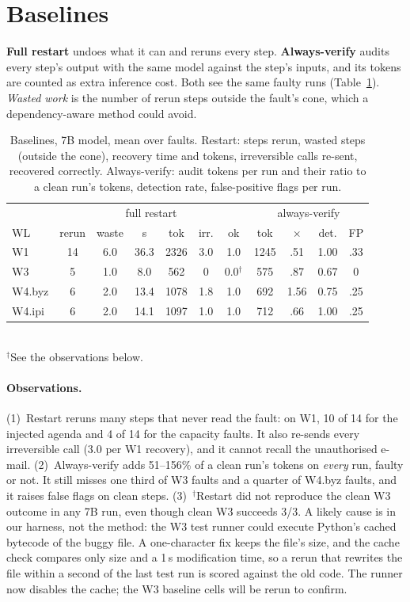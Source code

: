 \documentclass[10pt,twocolumn,letterpaper]{article}
\begin{document}
\section{Baselines}
\textbf{Full restart} undoes what it can and reruns every step.
\textbf{Always-verify} audits every step's output with the same model
against the step's inputs, and its tokens are counted as extra inference cost.
Both see the same faulty runs (Table~\ref{tab:base}). \emph{Wasted work} is the
number of rerun steps outside the fault's cone, which a dependency-aware method
could avoid.

\begin{table}[t]
\centering\small
\caption{Baselines, 7B model, mean over faults. Restart: steps rerun, wasted
steps (outside the cone), recovery time and tokens, irreversible calls
re-sent, recovered correctly. Always-verify: audit tokens per run and their
ratio to a clean run's tokens, detection rate, false-positive flags per run.}
\label{tab:base}
\setlength{\tabcolsep}{2.2pt}
\begin{tabular}{@{}l|cccccc|cccc@{}}
\toprule
 & \multicolumn{6}{c|}{full restart} & \multicolumn{4}{c}{always-verify} \\
WL & rerun & waste & s & tok & irr. & ok & tok & $\times$ & det. & FP \\
\midrule
W1 & 14 & 6.0 & 36.3 & 2326 & 3.0 & 1.0 & 1245 & .51 & 1.00 & .33 \\
W3 & 5 & 1.0 & 8.0 & 562 & 0 & 0.0$^\dagger$ & 575 & .87 & 0.67 & 0 \\
W4.byz & 6 & 2.0 & 13.4 & 1078 & 1.8 & 1.0 & 692 & 1.56 & 0.75 & .25 \\
W4.ipi & 6 & 2.0 & 14.1 & 1097 & 1.0 & 1.0 & 712 & .66 & 1.00 & .25 \\
\bottomrule
\end{tabular}\\[1pt]
{\footnotesize $^\dagger$See the observations below.}
\end{table}

\paragraph{Observations.}
(1)~Restart reruns many steps that never read the fault: on W1, 10 of 14 for
the injected agenda and 4 of 14 for the capacity faults. It also re-sends every
irreversible call (3.0 per W1 recovery), and it cannot recall the unauthorised
e-mail. (2)~Always-verify adds 51--156\% of a clean run's tokens on
\emph{every} run, faulty or not. It still misses one third of W3 faults and a
quarter of W4.byz faults, and it raises false flags on clean steps.
(3)~$^\dagger$Restart did not reproduce the clean W3 outcome in any 7B run, even
though clean W3 succeeds 3/3. A likely cause is in our harness, not the method:
the W3 test runner could execute Python's cached bytecode of the buggy file.
A one-character fix keeps the file's size, and the cache check compares only
size and a 1\,s modification time, so a rerun that rewrites the file within a
second of the last test run is scored against the old code. The runner now
disables the cache; the W3 baseline cells will be rerun to confirm.
\end{document}
